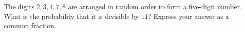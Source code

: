 The digits $2,3,4,7,8$ are arranged in random order to form a five-digit number. What is the probability that it is divisible by $11$? Express your answer as a common fraction.
